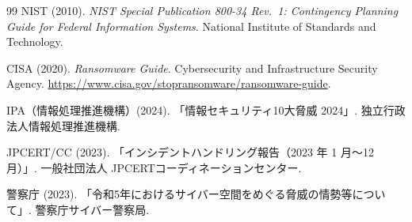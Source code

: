 \documentclass[12pt,a4paper]{article}
\theoremstyle{plain}
\theoremstyle{definition}
\theoremstyle{remark}
\begin{document}
\begin{thebibliography}{99}
NIST (2010).
\textit{NIST Special Publication 800-34 Rev.\ 1:
Contingency Planning Guide for Federal Information Systems}.
National Institute of Standards and Technology.

CISA (2020).
\textit{Ransomware Guide}.
Cybersecurity and Infrastructure Security Agency.
\url{https://www.cisa.gov/stopransomware/ransomware-guide}.

IPA（情報処理推進機構）(2024).
「情報セキュリティ10大脅威 2024」.
独立行政法人情報処理推進機構.

JPCERT/CC (2023).
「インシデントハンドリング報告（2023 年 1 月〜12 月）」.
一般社団法人 JPCERTコーディネーションセンター.

警察庁 (2023).
「令和5年におけるサイバー空間をめぐる脅威の情勢等について」.
警察庁サイバー警察局.

\end{thebibliography}
\end{document}
